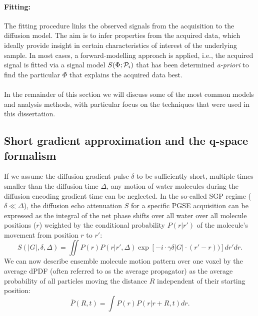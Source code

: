 \paragraph{Fitting:} The fitting procedure links the observed signals from the acquisition to the diffusion model. The aim is to infer properties from the acquired data, which ideally provide insight in certain characteristics of interest of the underlying sample. In most cases, a forward-modelling approach is applied, i.e., the acquired signal is fitted via a signal model $S(\Phi;\mathcal{P}_i)$ that has been determined \emph{a-priori} to find the particular $\Phi$ that explains the acquired data best.  
\paragraph{}
In the remainder of this section we will discuss some of the most common models and analysis methods, with particular focus on the techniques that were used in this dissertation. 
\subsection{Short gradient approximation and the q-space formalism}
If we assume the diffusion gradient pulse $\delta$ to be sufficiently short, multiple times smaller than the diffusion time $\Delta$, any motion of water molecules during the diffusion encoding gradient time can be neglected. In the so-called \gls{SGP} regime ($\delta \ll \Delta$), the diffusion echo attenuation $S$ for a specific PGSE acquisition can be expressed as the integral of the net phase shifts over all water over all molecule positions ($r$) weighted by the conditional probability $P(r|r')$ of the molecule's movement from position $r$ to $r'$\citep{Callaghan:1991}:
\begin{equation}
	S(|G|,\delta,\Delta)=\iint P(r)P(r|r',\Delta)\exp[-i\cdot \gamma \delta |G|\cdot (r'-r))] dr'dr.
	\label{eq:chapter2 signal in sgp}
\end{equation}
We can now describe ensemble molecule motion pattern over one voxel by the average \gls{dPDF} (often referred to as the average propagator\citep{Kaerger:1983}) as the average probability of all particles moving the distance $R$ independent of their starting position:
\begin{equation}
	\overline{P}(R,t)=\int P(r)P(r|r+R,t)dr.
	\label{eq:chapter2 dpdf}
\end{equation}

